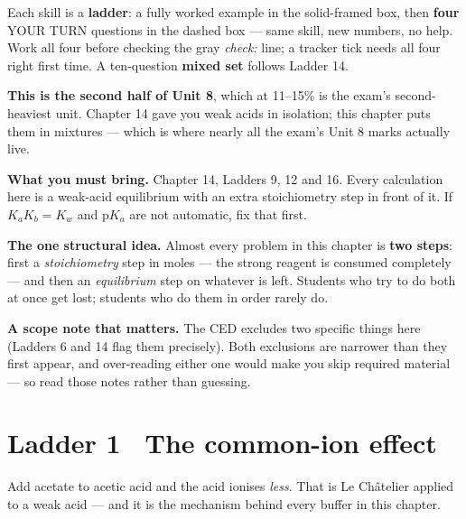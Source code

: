 \documentclass{apchem-worksheet}
\begin{document}
\apctitleblock

\begin{apcnote}
Each skill is a \textbf{ladder}: a fully worked example in the
solid-framed box, then \textbf{four} YOUR TURN questions in the dashed
box --- same skill, new numbers, no help. Work all four before checking
the gray \emph{check:} line; a tracker tick needs all four right first
time. A ten-question \textbf{mixed set} follows Ladder 14.

\textbf{This is the second half of Unit 8}, which at 11--15\% is the
exam's second-heaviest unit. Chapter 14 gave you weak acids in
isolation; this chapter puts them in mixtures --- which is where nearly
all the exam's Unit 8 marks actually live.

\textbf{What you must bring.} Chapter 14, Ladders 9, 12 and 16. Every
calculation here is a weak-acid equilibrium with an extra stoichiometry
step in front of it. If $K_{a}K_{b} = K_{w}$ and $\text{p}K_{a}$ are not
automatic, fix that first.

\textbf{The one structural idea.} Almost every problem in this chapter
is \textbf{two steps}: first a \emph{stoichiometry} step in moles ---
the strong reagent is consumed completely --- and then an
\emph{equilibrium} step on whatever is left. Students who try to do both
at once get lost; students who do them in order rarely do.

\textbf{A scope note that matters.} The CED excludes two specific
things here (Ladders 6 and 14 flag them precisely). Both exclusions are
narrower than they first appear, and over-reading either one would make
you skip required material --- so read those notes rather than
guessing.
\end{apcnote}

\section*{\sffamily Ladder 1 \textbullet\ The common-ion effect}

Add acetate to acetic acid and the acid ionises \emph{less}. That is
Le Ch\^{a}telier applied to a weak acid --- and it is the mechanism
behind every buffer in this chapter.
\end{document}
